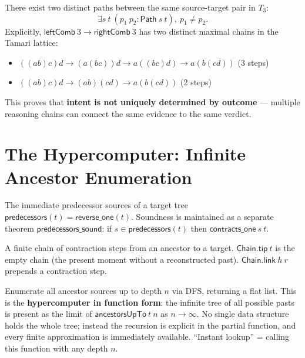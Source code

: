 \begin{theorem}
\label{thm:path_diversity}
\leanok
{}
There exist two distinct paths between the same source-target pair in $T_3$:
\[
\exists s\ t\ (p_1\ p_2 : \mathsf{Path}\ s\ t),\ p_1 \neq p_2.
\]
Explicitly, $\mathsf{leftComb}\ 3 \to \mathsf{rightComb}\ 3$ has two
distinct maximal chains in the Tamari lattice:
\begin{itemize}
  \item $((ab)c)d \to (a(bc))d \to a((bc)d) \to a(b(cd))$ (3 steps)
  \item $((ab)c)d \to (ab)(cd) \to a(b(cd))$ (2 steps)
\end{itemize}
This proves that \textbf{intent is not uniquely determined by outcome} ---
multiple reasoning chains can connect the same evidence to the same verdict.
\end{theorem}

\section{The Hypercomputer: Infinite Ancestor Enumeration}

\begin{definition}[Predecessors]
\label{def:predecessors}
\leanok
{}
The immediate predecessor sources of a target tree $\mathsf{predecessors}(t) = \mathsf{reverse\_one}(t)$.
Soundness is maintained as a separate theorem $\mathsf{predecessors\_sound}$:
if $s \in \mathsf{predecessors}(t)$ then $\mathsf{contracts\_one}\ s\ t$.
\end{definition}

\begin{definition}[Chain]
\label{def:chain}
\leanok
{}
A finite chain of contraction steps from an ancestor to a target.
$\mathsf{Chain.tip}\ t$ is the empty chain (the present moment without a
reconstructed past). $\mathsf{Chain.link}\ h\ r$ prepends a contraction step.
\end{definition}

\begin{definition}
\label{def:ancestorsUpTo}
\leanok
{}
Enumerate all ancestor sources up to depth $n$ via DFS, returning a flat list.
This is the \textbf{hypercomputer in function form}: the infinite tree of all
possible pasts is present as the limit of $\mathsf{ancestorsUpTo}\ t\ n$ as
$n \to \infty$. No single data structure holds the whole tree; instead the
recursion is explicit in the partial function, and every finite approximation
is immediately available. ``Instant lookup'' = calling this function with
any depth $n$.
\end{definition}

